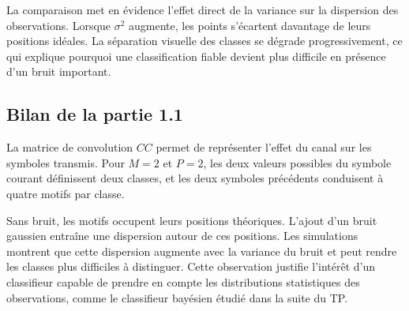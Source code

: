 La comparaison met en évidence l'effet direct de la variance sur la dispersion des observations. Lorsque $\sigma^2$ augmente, les points s'écartent davantage de leurs positions idéales. La séparation visuelle des classes se dégrade progressivement, ce qui explique pourquoi une classification fiable devient plus difficile en présence d'un bruit important.

\subsection{Bilan de la partie 1.1}

La matrice de convolution $CC$ permet de représenter l'effet du canal sur les symboles transmis. Pour $M=2$ et $P=2$, les deux valeurs possibles du symbole courant définissent deux classes, et les deux symboles précédents conduisent à quatre motifs par classe.

Sans bruit, les motifs occupent leurs positions théoriques. L'ajout d'un bruit gaussien entraîne une dispersion autour de ces positions. Les simulations montrent que cette dispersion augmente avec la variance du bruit et peut rendre les classes plus difficiles à distinguer. Cette observation justifie l'intérêt d'un classifieur capable de prendre en compte les distributions statistiques des observations, comme le classifieur bayésien étudié dans la suite du TP.





